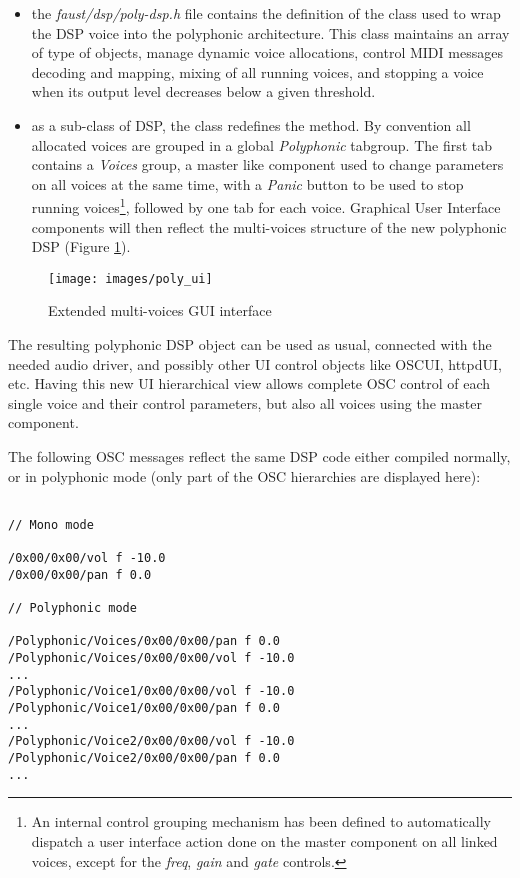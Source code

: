 \begin{itemize}

\item  the {\it faust/dsp/poly-dsp.h} file contains the definition of the  class used to wrap the DSP voice into the polyphonic architecture. This class maintains an array of   type of objects, manage dynamic voice allocations, control MIDI messages decoding and mapping, mixing of all running voices, and stopping a voice when its output level decreases below a given threshold.

\item as a sub-class of DSP, the   class redefines the  method. By convention all allocated voices are grouped in a global  {\it Polyphonic} tabgroup. The first tab contains a {\it Voices} group, a master like component used to change parameters on all voices at the same time, with a {\it Panic} button to be used to stop running voices\footnote{An internal control grouping mechanism has been defined to automatically dispatch a user interface action done on the master component on all linked voices, except for the  {\it freq}, {\it gain} and {\it gate} controls.}, followed by one tab for each voice. Graphical User Interface components will then reflect the multi-voices structure of the new polyphonic DSP (Figure \ref{fig:poly-ui}). 

 \end{itemize}
 
\begin{figure}[!ht]
\begin{center}
\texttt{[image: images/poly\_ui]}
\caption{\footnotesize Extended multi-voices GUI interface}
\label{fig:poly-ui}
\end{center}
\end{figure}

The resulting polyphonic DSP object can be used as usual, connected with the needed audio driver, and possibly other UI control objects like OSCUI, httpdUI, etc. Having this new UI hierarchical view allows complete OSC control of each single voice and their control parameters, but also all voices using the master component. 

The following OSC messages reflect the same DSP code either compiled normally,  or in polyphonic mode (only part of the OSC hierarchies are displayed here):

\footnotesize
\begin{lstlisting}

// Mono mode

/0x00/0x00/vol f -10.0
/0x00/0x00/pan f 0.0

// Polyphonic mode

/Polyphonic/Voices/0x00/0x00/pan f 0.0
/Polyphonic/Voices/0x00/0x00/vol f -10.0
...
/Polyphonic/Voice1/0x00/0x00/vol f -10.0
/Polyphonic/Voice1/0x00/0x00/pan f 0.0
...
/Polyphonic/Voice2/0x00/0x00/vol f -10.0
/Polyphonic/Voice2/0x00/0x00/pan f 0.0
...
\end{lstlisting}
\normalsize

